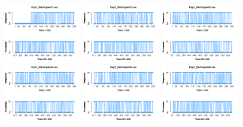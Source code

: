 \begin{figure}[th]
\centering
\includegraphics[width=0.30\textwidth]{Figures/Response_Exp1_P1} \includegraphics[width=0.30\textwidth]{Figures/Response_Exp1_P2} \includegraphics[width=0.30\textwidth]{Figures/Response_Exp1_P3}
\includegraphics[width=0.30\textwidth]{Figures/Response_Exp1_P4} \includegraphics[width=0.30\textwidth]{Figures/Response_Exp1_P5} \includegraphics[width=0.30\textwidth]{Figures/Response_Exp1_P6}

\end{figure}
